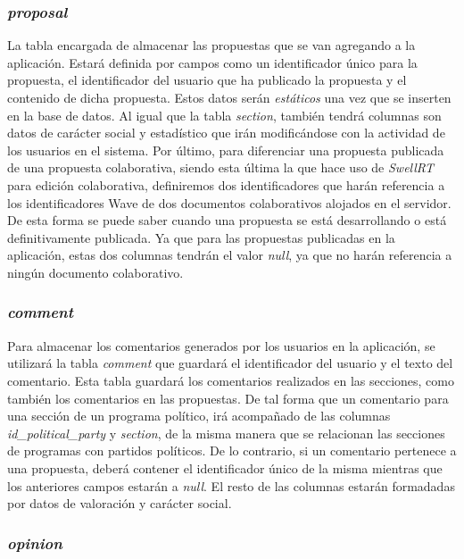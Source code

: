 \subsubsection{\textit{proposal}}

La tabla encargada de almacenar las propuestas que se van agregando a la aplicación. Estará definida por campos como un identificador único para la propuesta, el identificador del usuario que ha publicado la propuesta y el contenido de dicha propuesta. Estos datos serán \textit{estáticos} una vez que se inserten en la base de datos. Al igual que la tabla \textit{section}, también tendrá columnas son datos de carácter social y estadístico que irán modificándose con la actividad de los usuarios en el sistema. Por último, para diferenciar una propuesta publicada de una propuesta colaborativa, siendo esta última la que hace uso de \textit{SwellRT} para edición colaborativa, definiremos dos identificadores que harán referencia a los identificadores Wave de dos documentos colaborativos alojados en el servidor. De esta forma se puede saber cuando una propuesta se está desarrollando o está definitivamente publicada. Ya que para las propuestas publicadas en la aplicación, estas dos columnas tendrán el valor \textit{null}, ya que no harán referencia a ningún documento colaborativo.

\subsubsection{\textit{comment}}

Para almacenar los comentarios generados por los usuarios en la aplicación, se utilizará la tabla \textit{comment} que guardará el identificador del usuario y el texto del comentario. Esta tabla guardará los comentarios realizados en las secciones, como también los comentarios en las propuestas. De tal forma que un comentario para una sección de un programa político, irá acompañado de las columnas \textit{id\_political\_party} y \textit{section}, de la misma manera que se relacionan las secciones de programas con partidos políticos. De lo contrario, si un comentario pertenece a una propuesta, deberá contener el identificador único de la misma mientras que los anteriores campos estarán a \textit{null}. El resto de las columnas estarán formadadas por datos de valoración y carácter social.

\subsubsection{\textit{opinion}}

